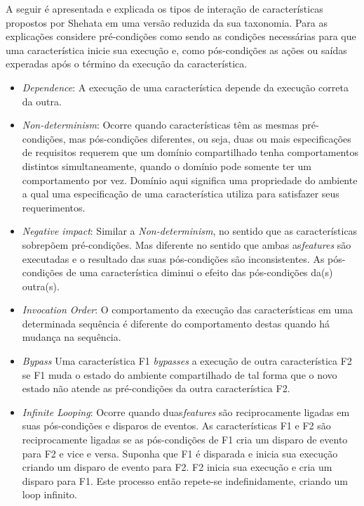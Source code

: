 A seguir é apresentada e explicada os tipos de interação de características propostos por Shehata em uma versão reduzida da sua taxonomia\cite{NHLABATSI:2008}. Para as explicações considere pré-condições como sendo as condições necessárias para que uma característica inicie sua execução e, como pós-condições as ações ou saídas experadas após o término da execução da característica.

\begin{itemize}
\item \textit{Dependence}: A execução de uma característica depende da execução correta da outra.
\item \textit{Non-determinism}: Ocorre quando características têm as mesmas pré-condições, mas pós-condições diferentes, ou seja, duas ou mais especificações de requisitos requerem que um domínio compartilhado tenha comportamentos distintos simultaneamente, quando o domínio pode somente ter um comportamento por vez. Domínio aqui significa uma propriedade do ambiente a qual uma especificação de uma característica utiliza para satisfazer seus requerimentos. 
\item \textit{Negative impact}: Similar a \textit{Non-determinism}, no sentido que as características sobrepõem pré-condições. Mas diferente no sentido que ambas as\textit{features} são executadas e o resultado das suas pós-condições são inconsistentes. As pós-condições de uma característica diminui o efeito das pós-condições da(s) outra(s).
\item \textit{Invocation Order}: O comportamento da execução das características em uma determinada sequência é diferente do comportamento destas quando há mudança na sequência.
\item \textit{Bypass} Uma característica F1 \textit{bypasses} a execução de outra característica F2 se F1 muda o estado do ambiente compartilhado de tal forma que o novo estado não atende as pré-condições da outra característica F2.
\item \textit{Infinite Looping}: Ocorre quando duas\textit{features} são reciprocamente ligadas em suas pós-condições e disparos de eventos. As características F1 e F2 são reciprocamente ligadas se as pós-condições de F1 cria um disparo de evento para F2 e vice e versa. Suponha que F1 é disparada e inicia sua execução criando um disparo de evento para F2. F2 inicia sua execução e cria um disparo para F1. Este processo então repete-se indefinidamente, criando um loop infinito.  
\end{itemize}

